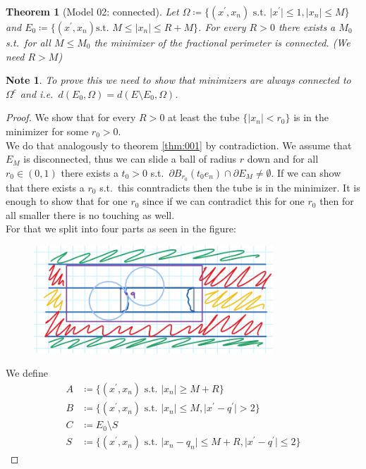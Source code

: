 \documentclass[11pt]{article}
\newtheorem{theorem}[definition]{Theorem}
\newtheorem*{note}{Note}
\begin{document}
\begin{theorem}[Model 02: connected]
	\label{thm:003}
	Let \( \Omega \coloneqq \{(x^\prime, x_n) \text{ s.t. } \lvert x^\prime \rvert \leq
	1, \lvert x_n \rvert \leq M \} \) and \( E_0 \coloneqq \{ (x^\prime, x_n) \text{
		s.t. } M \leq \lvert x_n \rvert \leq R+M \} \). For every \( R > 0 \) there exists a
	\( M_0 \) s.t.\ for all \( M \leq M_0 \) the minimizer of the fractional perimeter
	is connected. (We need \( R > M \))
\end{theorem}
\begin{note}
	To prove this we need to show that minimizers are always connected to \( \Omega^c
	\) and i.e.\ \( d(E_0, \Omega) = d(E\setminus E_0, \Omega) \).
\end{note}
\begin{proof}
	We show that for every \( R > 0 \) at least the tube \( \{ \lvert x_n \rvert < r_0 \}
	\) is in the minimizer for some \( r_0 > 0 \). \\
	We do that analogously to theorem \cref{thm:001} by contradiction. We assume that \(
	E_M \) is disconnected, thus we can slide a ball of radius \( r \) down and for all
	\( r_0 \in (0,1) \) there exists a \( t_0 > 0 \) s.t.\ \( \partial B_{r_0}(t_0 e_n
	) \cap \partial E_M \neq \emptyset \). If we can show that there exists a \( r_0
	\) s.t.\ this conntradicts then the tube is in the minimizer. It is enough to show
	that for one \( r_0 \) since if we can contradict this for one \( r_0 \) then for
	all smaller there is no touching as well. \\
	For that we split into four parts as seen in the figure:
	\begin{figure}[h]
		\centering
		\includegraphics[width = 0.8\textwidth]{figures/Screenshot_20240107_160324.png}
		\caption{}
		\label{fig:002}
	\end{figure}
	\par
	We define
	\begin{align*}
		A & \coloneqq \{(x^\prime,x_n) \text{ s.t. } \lvert x_n \rvert \geq M+R \} \\
		B & \coloneqq \{(x^\prime,x_n) \text{ s.t. } \lvert x_n \rvert \leq M, \lvert x^\prime -q^\prime \rvert > 2 \} \\
		C & \coloneqq E_0 \setminus S \\
		S & \coloneqq \{ (x^\prime,x_n) \text{ s.t. } \lvert x_n - q_n \rvert \leq M+R, \lvert x^\prime -q^\prime \rvert \leq 2\}
	\end{align*}


\end{proof}
\end{document}

